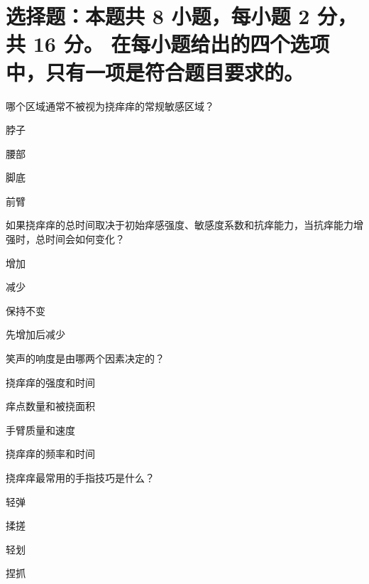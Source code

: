 \documentclass{exam-zh}
\begin{document}
\section{%
  选择题：本题共 8 小题，每小题 2 分，共 16 分。
  在每小题给出的四个选项中，只有一项是符合题目要求的。
}


\begin{question}[points = 2]
  哪个区域通常不被视为挠痒痒的常规敏感区域？



  \begin{choices}
    \item 脖子
    \item 腰部
    \item 脚底
    \item 前臂
  \end{choices}
\end{question}
\begin{question}[points = 2]
  如果挠痒痒的总时间取决于初始痒感强度、敏感度系数和抗痒能力，当抗痒能力增强时，总时间会如何变化？

  \begin{choices}
    \item 增加
    \item 减少
    \item 保持不变
    \item 先增加后减少
  \end{choices}
\end{question}

\begin{question}[points = 2]
  笑声的响度是由哪两个因素决定的？

  \begin{choices}
    \item 挠痒痒的强度和时间
    \item 痒点数量和被挠面积
    \item 手臂质量和速度
    \item 挠痒痒的频率和时间
  \end{choices}
\end{question}

\begin{question}[points = 2]
  挠痒痒最常用的手指技巧是什么？

  \begin{choices}
    \item 轻弹
    \item 揉搓
    \item 轻划
    \item 捏抓
  \end{choices}
\end{question}
\end{document}
